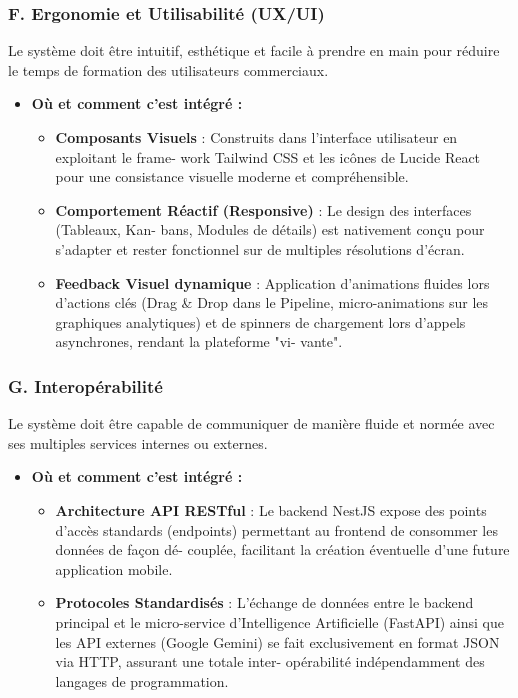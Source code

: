\subsubsection{F. Ergonomie et Utilisabilité (UX/UI)}

Le système doit être intuitif, esthétique et facile à prendre en main pour réduire le temps de formation des utilisateurs commerciaux.

\begin{itemize}
    \item \textbf{Où et comment c’est intégré :}
    \begin{itemize}
        \item \textbf{Composants Visuels} : Construits dans l’interface utilisateur en exploitant le frame-
        work Tailwind CSS et les icônes de Lucide React pour une consistance visuelle moderne et compréhensible.
        \item \textbf{Comportement Réactif (Responsive)} : Le design des interfaces (Tableaux, Kan-
        bans, Modules de détails) est nativement conçu pour s’adapter et rester fonctionnel sur de multiples résolutions d’écran.
        \item \textbf{Feedback Visuel dynamique} : Application d’animations fluides lors d’actions clés (Drag \& Drop dans le Pipeline, micro-animations sur les graphiques analytiques) et de spinners de chargement lors d’appels asynchrones, rendant la plateforme "vi-
        vante".
    \end{itemize}
\end{itemize}

\subsubsection{G. Interopérabilité}

Le système doit être capable de communiquer de manière fluide et normée avec ses multiples services internes ou externes.

\begin{itemize}
    \item \textbf{Où et comment c’est intégré :}
    \begin{itemize}
        \item \textbf{Architecture API RESTful} : Le backend NestJS expose des points d’accès standards (endpoints) permettant au frontend de consommer les données de façon dé-
        couplée, facilitant la création éventuelle d’une future application mobile.
        \item \textbf{Protocoles Standardisés} : L’échange de données entre le backend principal et le micro-service d’Intelligence Artificielle (FastAPI) ainsi que les API externes (Google Gemini) se fait exclusivement en format JSON via HTTP, assurant une totale inter-
        opérabilité indépendamment des langages de programmation.
    \end{itemize}
\end{itemize}

